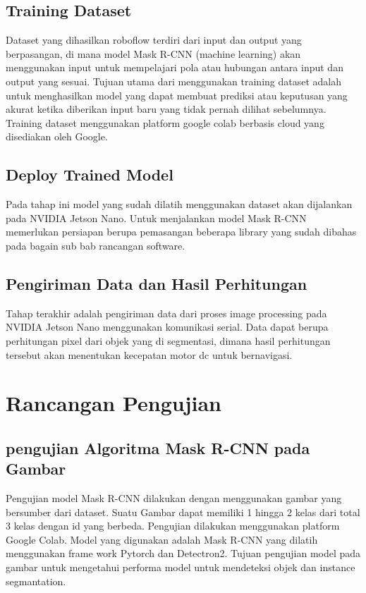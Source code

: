 \subsection{Training Dataset}
Dataset yang dihasilkan roboflow terdiri dari input dan output yang berpasangan, di mana model Mask R-CNN (machine learning) akan menggunakan input untuk mempelajari pola atau hubungan antara input dan output yang sesuai. Tujuan utama dari menggunakan training dataset adalah untuk menghasilkan model yang dapat membuat prediksi atau keputusan yang akurat ketika diberikan input baru yang tidak pernah dilihat sebelumnya. Training dataset menggunakan platform google colab berbasis cloud yang disediakan oleh Google. 
\subsection{Deploy Trained Model}
Pada tahap ini model yang sudah dilatih menggunakan dataset akan dijalankan pada NVIDIA Jetson Nano. Untuk menjalankan model Mask R-CNN memerlukan persiapan berupa pemasangan beberapa library yang sudah dibahas pada bagain sub bab rancangan software.
\subsection{Pengiriman Data dan Hasil Perhitungan}
Tahap terakhir adalah pengiriman data dari proses image processing pada NVIDIA Jetson Nano menggunakan komunikasi serial. Data dapat berupa perhitungan pixel dari objek yang di segmentasi, dimana hasil perhitungan tersebut akan menentukan kecepatan motor dc untuk bernavigasi.

\section{Rancangan Pengujian}
\subsection{pengujian Algoritma Mask R-CNN pada Gambar}
Pengujian model Mask R-CNN dilakukan dengan menggunakan gambar yang bersumber dari dataset. Suatu Gambar dapat memiliki 1 hingga 2 kelas dari total 3 kelas dengan id yang berbeda. Pengujian dilakukan menggunakan platform Google Colab. Model yang digunakan adalah Mask R-CNN yang dilatih menggunakan frame work Pytorch dan Detectron2. Tujuan pengujian model pada gambar untuk mengetahui performa model untuk mendeteksi objek dan instance segmantation. 

